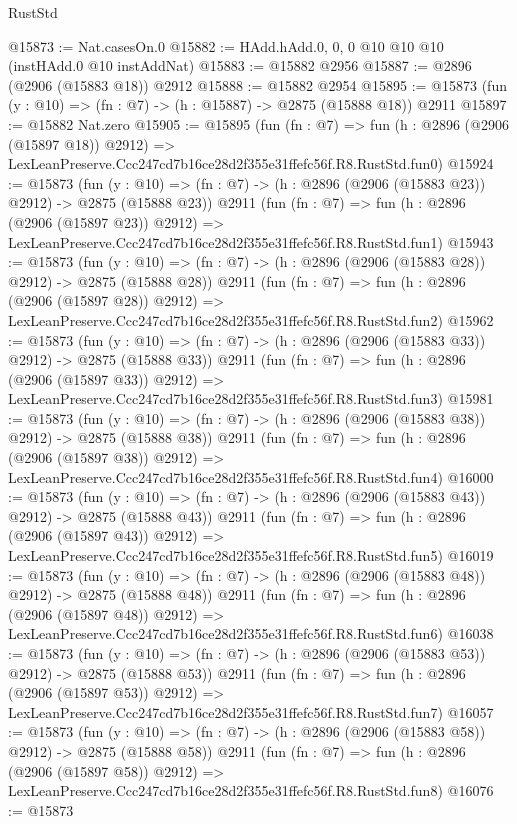 \begin{lexlean}{RustStd}
\begin{coremodule}
@15873 := Nat.casesOn.{0}
@15882 := HAdd.hAdd.{0, 0, 0} @10 @10 @10 (instHAdd.{0} @10 instAddNat)
@15883 := @15882 @2956
@15887 := @2896 (@2906 (@15883 @18)) @2912
@15888 := @15882 @2954
@15895 := @15873 (fun (y : @10) => (fn : @7) -> (h : @15887) -> @2875 (@15888 @18)) @2911
@15897 := @15882 Nat.zero
@15905 := @15895
    (fun (fn : @7) =>
    fun (h : @2896 (@2906 (@15897 @18)) @2912) =>
    LexLeanPreserve.Ccc247cd7b16ce28d2f355e31ffefc56f.R8.RustStd.fun0)
@15924 := @15873
    (fun (y : @10) => (fn : @7) -> (h : @2896 (@2906 (@15883 @23)) @2912) -> @2875 (@15888 @23))
    @2911
    (fun (fn : @7) =>
    fun (h : @2896 (@2906 (@15897 @23)) @2912) =>
    LexLeanPreserve.Ccc247cd7b16ce28d2f355e31ffefc56f.R8.RustStd.fun1)
@15943 := @15873
    (fun (y : @10) => (fn : @7) -> (h : @2896 (@2906 (@15883 @28)) @2912) -> @2875 (@15888 @28))
    @2911
    (fun (fn : @7) =>
    fun (h : @2896 (@2906 (@15897 @28)) @2912) =>
    LexLeanPreserve.Ccc247cd7b16ce28d2f355e31ffefc56f.R8.RustStd.fun2)
@15962 := @15873
    (fun (y : @10) => (fn : @7) -> (h : @2896 (@2906 (@15883 @33)) @2912) -> @2875 (@15888 @33))
    @2911
    (fun (fn : @7) =>
    fun (h : @2896 (@2906 (@15897 @33)) @2912) =>
    LexLeanPreserve.Ccc247cd7b16ce28d2f355e31ffefc56f.R8.RustStd.fun3)
@15981 := @15873
    (fun (y : @10) => (fn : @7) -> (h : @2896 (@2906 (@15883 @38)) @2912) -> @2875 (@15888 @38))
    @2911
    (fun (fn : @7) =>
    fun (h : @2896 (@2906 (@15897 @38)) @2912) =>
    LexLeanPreserve.Ccc247cd7b16ce28d2f355e31ffefc56f.R8.RustStd.fun4)
@16000 := @15873
    (fun (y : @10) => (fn : @7) -> (h : @2896 (@2906 (@15883 @43)) @2912) -> @2875 (@15888 @43))
    @2911
    (fun (fn : @7) =>
    fun (h : @2896 (@2906 (@15897 @43)) @2912) =>
    LexLeanPreserve.Ccc247cd7b16ce28d2f355e31ffefc56f.R8.RustStd.fun5)
@16019 := @15873
    (fun (y : @10) => (fn : @7) -> (h : @2896 (@2906 (@15883 @48)) @2912) -> @2875 (@15888 @48))
    @2911
    (fun (fn : @7) =>
    fun (h : @2896 (@2906 (@15897 @48)) @2912) =>
    LexLeanPreserve.Ccc247cd7b16ce28d2f355e31ffefc56f.R8.RustStd.fun6)
@16038 := @15873
    (fun (y : @10) => (fn : @7) -> (h : @2896 (@2906 (@15883 @53)) @2912) -> @2875 (@15888 @53))
    @2911
    (fun (fn : @7) =>
    fun (h : @2896 (@2906 (@15897 @53)) @2912) =>
    LexLeanPreserve.Ccc247cd7b16ce28d2f355e31ffefc56f.R8.RustStd.fun7)
@16057 := @15873
    (fun (y : @10) => (fn : @7) -> (h : @2896 (@2906 (@15883 @58)) @2912) -> @2875 (@15888 @58))
    @2911
    (fun (fn : @7) =>
    fun (h : @2896 (@2906 (@15897 @58)) @2912) =>
    LexLeanPreserve.Ccc247cd7b16ce28d2f355e31ffefc56f.R8.RustStd.fun8)
@16076 := @15873

\end{coremodule}
\end{lexlean}
